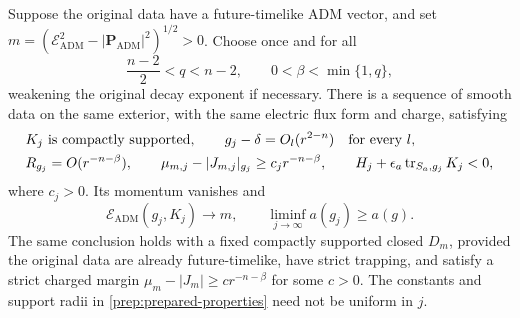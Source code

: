 \begin{proposition}
\label{prep:rest-preparation}
Suppose the original data have a future-timelike ADM vector, and set
$m=(\mathcal E_{\mathrm{ADM}}^2-|\mathbf P_{\mathrm{ADM}}|^2)^{1/2}>0$.
Choose once and for all
\[
 \frac{n-2}{2}<q<n-2,
 \qquad 0<\beta<\min\{1,q\},
\]
weakening the original decay exponent if necessary.  There is a sequence
of smooth data on the same exterior, with the same electric flux form
and charge, satisfying
\begin{align}
 \label{prep:prepared-properties}
 &K_j\text{ is compactly supported},\qquad
   g_j-\delta=O_l(r^{2-n})\quad\text{for every }l,\\
 &R_{g_j}=O(r^{-n-\beta}),\qquad
   \mu_{m,j}-|J_{m,j}|_{g_j}\geq c_jr^{-n-\beta},\qquad
   H_j+\epsilon_a\operatorname{tr}_{S_a,g_j}K_j<0,
 \nonumber
\end{align}
where $c_j>0$.  Its momentum vanishes and
\begin{equation}
 \label{prep:prepared-limits}
 \mathcal E_{\mathrm{ADM}}(g_j,K_j)\longrightarrow m,
 \qquad \liminf_{j\to\infty}a(g_j)\geq a(g).
\end{equation}
The same conclusion holds with a fixed compactly supported closed
$D_m$, provided the original data are already future-timelike, have
strict trapping, and satisfy a strict charged margin
$\mu_m-|J_m|\geq c r^{-n-\beta}$ for some $c>0$.
The constants and support radii in
\eqref{prep:prepared-properties} need not be uniform in $j$.
\end{proposition}

